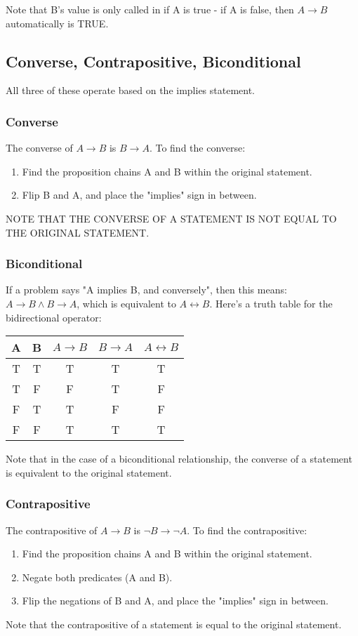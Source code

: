 Note that B's value is only called in if A is true - if A is false, then $A \rightarrow B$ automatically is TRUE.

\subsection{Converse, Contrapositive, Biconditional}
All three of these operate based on the implies statement.

\subsubsection{Converse}
The converse of $A\rightarrow B$ is $B\rightarrow A$. To find the converse:
\begin{enumerate}
    \item Find the proposition chains A and B within the original statement.
    \item Flip B and A, and place the "implies" sign in between.
\end{enumerate}

NOTE THAT THE CONVERSE OF A STATEMENT IS NOT EQUAL TO THE ORIGINAL STATEMENT.

\subsubsection{Biconditional}
If a problem says "A implies B, and conversely", then this means: $A \rightarrow B \land B \rightarrow A$, which is equivalent to $A \leftrightarrow B$. Here's a truth table for the bidirectional operator:

\vspace{1em}
\begin{tabular}{c|c|c|c|c}
    A & B & $A \rightarrow B$ & $B \rightarrow A$ & $A\leftrightarrow B$ \\
    \hline
    T & T & T & T & T \\
    T & F & F & T & F \\
    F & T & T & F & F \\
    F & F & T & T & T \\
\end{tabular}
\vspace{1em}

Note that in the case of a biconditional relationship, the converse of a statement is equivalent to the original statement.

\subsubsection{Contrapositive}
The contrapositive of $A\rightarrow B$ is $\neg B \rightarrow \neg A$. To find the contrapositive:
\begin{enumerate}
    \item Find the proposition chains A and B within the original statement.
    \item Negate both predicates (A and B).
    \item Flip the negations of B and A, and place the "implies" sign in between.
\end{enumerate}
Note that the contrapositive of a statement is equal to the original statement.

